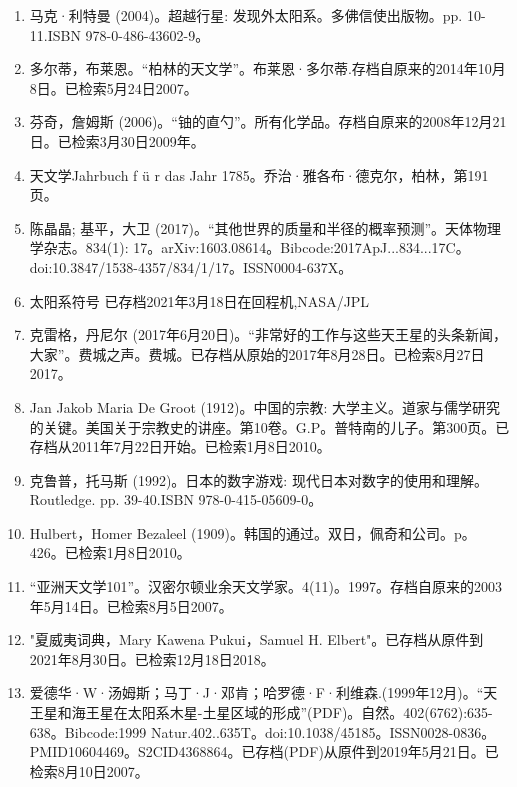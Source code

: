 \begin{enumerate}
已经在1782年3月12日在当地自然历史学会的预读论文中，我有土星父亲的名字，即天王星，或者因为它是通常与拉丁后缀，提出了天王星，并从此有幸，各种天文学家和数学家，在他们的著作或给我的信中引用了这个名称。在我看来，有必要遵循这次选举中的神话，这是从其他行星的古老名称中借来的; 因为在先前已知的系列中，感知到一个奇怪的人或事件的现代一个星球的名字会非常明显。西里西亚的Diodorus讲述了阿特拉斯的故事，阿特拉斯是一个古老的民族，居住在非洲最肥沃的地区之一，并将他的国家的海岸视为众神的家园。天王星是她的第一个国王，他们文明生活的创始人，许多有用的艺术的发明者。同时他也被描述为一个勤奋和熟练的古代天文学家...更重要的是: 天王星是土星和地图集的父亲，因为前者是木星之父。
\item 马克·利特曼 (2004)。超越行星: 发现外太阳系。多佛信使出版物。pp. 10-11.ISBN  978-0-486-43602-9。
\item 多尔蒂，布莱恩。“柏林的天文学”。布莱恩·多尔蒂.存档自原来的2014年10月8日。已检索5月24日2007。
\item 芬奇，詹姆斯 (2006)。“铀的直勺”。所有化学品。存档自原来的2008年12月21日。已检索3月30日2009年。
\item 天文学Jahrbuch f ü r das Jahr 1785。乔治·雅各布·德克尔，柏林，第191页。
\item 陈晶晶; 基平，大卫 (2017)。“其他世界的质量和半径的概率预测”。天体物理学杂志。834(1): 17。arXiv:1603.08614。Bibcode:2017ApJ...834...17C。doi:10.3847/1538-4357/834/1/17。ISSN0004-637X。 
\item 太阳系符号 已存档2021年3月18日在回程机,NASA/JPL
\item 克雷格，丹尼尔 (2017年6月20日)。“非常好的工作与这些天王星的头条新闻，大家”。费城之声。费城。已存档从原始的2017年8月28日。已检索8月27日2017。
\item Jan Jakob Maria De Groot (1912)。中国的宗教: 大学主义。道家与儒学研究的关键。美国关于宗教史的讲座。第10卷。G.P。普特南的儿子。第300页。已存档从2011年7月22日开始。已检索1月8日2010。
\item 克鲁普，托马斯 (1992)。日本的数字游戏: 现代日本对数字的使用和理解。Routledge. pp. 39-40.ISBN 978-0-415-05609-0。
\item Hulbert，Homer Bezaleel (1909)。韩国的通过。双日，佩奇和公司。p。 426。已检索1月8日2010。
\item “亚洲天文学101”。汉密尔顿业余天文学家。4(11)。1997。存档自原来的2003年5月14日。已检索8月5日2007。
\item "夏威夷词典，Mary Kawena Pukui，Samuel H. Elbert"。已存档从原件到2021年8月30日。已检索12月18日2018。
\item 爱德华·W·汤姆斯；马丁·J·邓肯；哈罗德·F·利维森.(1999年12月)。“天王星和海王星在太阳系木星-土星区域的形成”(PDF)。自然。402(6762):635-638。Bibcode:1999 Natur.402..635T。doi:10.1038/45185。ISSN0028-0836。PMID10604469。S2CID4368864。已存档(PDF)从原件到2019年5月21日。已检索8月10日2007。    

\end{enumerate}
